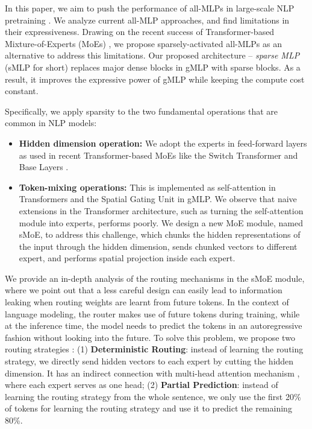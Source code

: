 \documentclass{article}
\begin{document}
In this paper, we aim to push the performance of all-MLPs in large-scale NLP pretraining \citep{devlin2018bert,radford2018improving,raffel2019exploring,liu2019roberta,brown2020language}. We analyze current all-MLP approaches, and find limitations in their expressiveness. Drawing on the recent success of Transformer-based Mixture-of-Experts (MoEs) \citep{gshard,switch,baselayer,hashlayer,alibaba}, we propose sparsely-activated all-MLPs as an alternative to address this limitations. Our proposed architecture -- \textit{sparse MLP} (sMLP for short)  replaces major dense blocks in gMLP \citep{gmlp} with sparse blocks. As a result, it improves the expressive power of gMLP while keeping the compute cost constant. 


Specifically, we apply sparsity to the two fundamental operations that are common in NLP models: 
\begin{itemize}
\vspace{-2mm}
    \item \textbf{Hidden dimension operation:} We adopt the experts in feed-forward layers as used in recent Transformer-based MoEs like the Switch Transformer \citep{switch} and Base Layers \citep{baselayer}.
\item \textbf{Token-mixing operations:} This is implemented as self-attention in Transformers and the Spatial Gating Unit in gMLP. We observe that naive extensions in the Transformer architecture, such as turning the self-attention module into experts, performs poorly. We design a new MoE module, named sMoE, to address this challenge, which chunks the hidden representations of the input through the hidden dimension, sends chunked vectors to different expert, and performs spatial projection inside each expert.
\end{itemize}


We provide an in-depth analysis of the routing mechanisms in the sMoE module, where we point out that a less careful design can easily lead to information leaking when routing weights are learnt from future tokens. In the context of language modeling, the router makes use of future tokens during training, while at the inference time, the model needs to predict the tokens in an autoregressive fashion without looking into the future. To solve this problem, we propose two routing strategies : (1) \textbf{Deterministic Routing}: instead of learning the routing strategy, we directly send hidden vectors to each expert by cutting the hidden dimension. It has an indirect connection with multi-head attention mechanism \citep{vaswani2017attention}, where each expert serves as one head; (2) \textbf{Partial Prediction}: instead of learning the routing strategy from the whole sentence, we only use the first 20\% of tokens for learning the routing strategy and use it to predict the remaining 80\%. 
\end{document}
